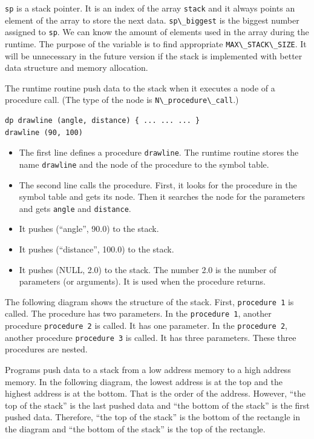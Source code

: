 \passthrough{\lstinline!sp!} is a stack pointer. It is an index of the
array \passthrough{\lstinline!stack!} and it always points an element of
the array to store the next data. \passthrough{\lstinline!sp\_biggest!}
is the biggest number assigned to \passthrough{\lstinline!sp!}. We can
know the amount of elements used in the array during the runtime. The
purpose of the variable is to find appropriate
\passthrough{\lstinline!MAX\_STACK\_SIZE!}. It will be unnecessary in
the future version if the stack is implemented with better data
structure and memory allocation.

The runtime routine push data to the stack when it executes a node of a
procedure call. (The type of the node is
\passthrough{\lstinline!N\_procedure\_call!}.)

\begin{lstlisting}
dp drawline (angle, distance) { ... ... ... }
drawline (90, 100)
\end{lstlisting}

\begin{itemize}
\tightlist
\item
  The first line defines a procedure \passthrough{\lstinline!drawline!}.
  The runtime routine stores the name \passthrough{\lstinline!drawline!}
  and the node of the procedure to the symbol table.
\item
  The second line calls the procedure. First, it looks for the procedure
  in the symbol table and gets its node. Then it searches the node for
  the parameters and gets \passthrough{\lstinline!angle!} and
  \passthrough{\lstinline!distance!}.
\item
  It pushes (``angle'', 90.0) to the stack.
\item
  It pushes (``distance'', 100.0) to the stack.
\item
  It pushes (NULL, 2.0) to the stack. The number 2.0 is the number of
  parameters (or arguments). It is used when the procedure returns.
\end{itemize}

The following diagram shows the structure of the stack. First,
\passthrough{\lstinline!procedure 1!} is called. The procedure has two
parameters. In the \passthrough{\lstinline!procedure 1!}, another
procedure \passthrough{\lstinline!procedure 2!} is called. It has one
parameter. In the \passthrough{\lstinline!procedure 2!}, another
procedure \passthrough{\lstinline!procedure 3!} is called. It has three
parameters. These three procedures are nested.

Programs push data to a stack from a low address memory to a high
address memory. In the following diagram, the lowest address is at the
top and the highest address is at the bottom. That is the order of the
address. However, ``the top of the stack'' is the last pushed data and
``the bottom of the stack'' is the first pushed data. Therefore, ``the
top of the stack'' is the bottom of the rectangle in the diagram and
``the bottom of the stack'' is the top of the rectangle.

